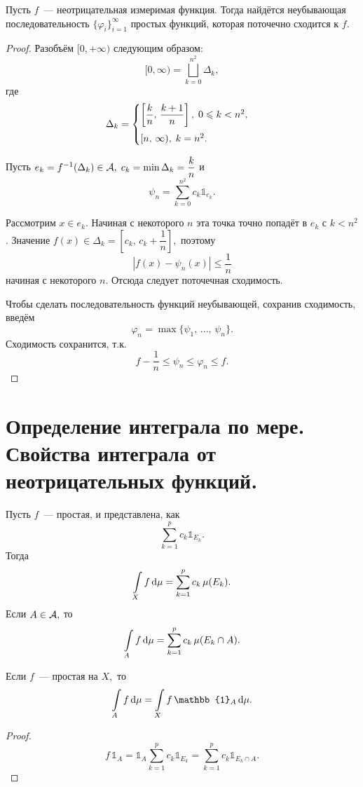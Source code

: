\documentclass{notes}
\begin{document}
	\begin{thm}
		Пусть $f$~--- неотрицательная измеримая функция. Тогда найдётся неубывающая последовательность $\{\varphi_i\}_{i = 1}^{\infty}$ простых функций, которая поточечно сходится к $f$.
		\begin{proof}
			Разобъём $[0, +\infty)$ следующим образом:
			\[
				[0, \infty) = \bigsqcup\limits_{k = 0}^{n^2} \Delta_k,
			\]
			где
			\[
				\Delta_k = \begin{cases}
					\left[\dfrac{k}{n}, \, \dfrac{k + 1}{n}\right], \; 0 \leqslant k < n^2, \vspace{0.5em}\\
					[n, \, \infty), \; k = n^2.
				\end{cases}
			\]

			Пусть $e_k = f^{-1}(\Delta_k) \in \mathcal{A}, \; c_k = \min \Delta_k = \dfrac{k}{n}$ и
			\[
				\psi_n = \sum\limits_{k = 0}^{n^2} c_k \mathbb{1}_{e_k}.
			\]

			Рассмотрим $x \in e_k$. Начиная с некоторого $n$ эта точка точно попадёт в $e_k$ с $k < n^2$. Значение $f(x) \in \Delta_k = \left[c_k, \, c_k + \dfrac{1}{n}\right],$ поэтому 
			\[
				|f(x) - \psi_n(x)| \leqslant \dfrac{1}{n}
			\]
			начиная с некоторого $n$. Отсюда следует поточечная сходимость.

			Чтобы сделать последовательность функций неубывающей, сохранив сходимость, введём
			\[
				\varphi_n = \max\{\psi_1, \, ..., \, \psi_n\}.
			\]
			Сходимость сохранится, т.к.
			\[
				f - \dfrac{1}{n} \leqslant \psi_n \leqslant \varphi_n \leqslant f. 
			\]
		\end{proof}
	\end{thm}

\section{Определение интеграла по мере. Свойства интеграла от неотрицательных функций.}
	
	\begin{de}
		Пусть $f$~--- простая, и представлена, как
		\[
			\sum\limits_{k = 1}^p c_k \mathbb{1}_{E_k}.
		\]
		Тогда
		\[
			\int\limits_{X} f \, \mathrm{d} \mu = \sum\limits_{k = 1}^p c_k \, \mu(E_k).
		\]
		Если $A \in \mathcal{A},$ то
		\[
			\int\limits_{A} f \, \mathrm{d} \mu = \sum\limits_{k = 1}^p c_k \, \mu(E_k \cap A).
		\]
	\end{de}

	\begin{st}
		Если $f$~--- простая на $X,$ то 
		\[
			\int\limits_{A} f \D \mu = \int\limits_{X} f \, \mathbb{1}_A \D \mu.
		\]
		\begin{proof}
			\[
				f \, \mathbb{1}_A = \mathbb{1}_A \sum\limits_{k = 1}^p c_k \mathbb{1}_{E_k} = \sum\limits_{k = 1}^p c_k \mathbb{1}_{E_k \cap A}. 
			\]
		\end{proof}
	\end{st}
\end{document}
